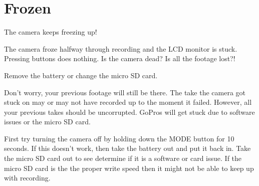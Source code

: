 \chapter{Frozen}
\pagecolor{white}
\label{chap:18}
\begin{fullwidth}


\problem

{\large The camera keeps freezing up!


 \par}

The camera froze halfway through recording and the LCD monitor is stuck. Pressing buttons does nothing. Is the camera dead? Is all the footage lost?! 


\solution

{\large Remove the battery or change the micro SD card.



 \par}

Don’t worry, your previous footage will still be there. The take the camera got stuck on may or may not have recorded up to the moment it failed. However, all your previous takes should be uncorrupted. GoPros will get stuck due to software issues or the micro SD card. 

First try turning the camera off by holding down the MODE button for 10 seconds. 
If this doesn’t work, then take the battery out and put it back in. Take the micro SD card out to see determine if it is a software or card issue. If the micro SD card is the the proper write speed then it might not be able to keep up with recording. 






\clearpage
\end{fullwidth}
